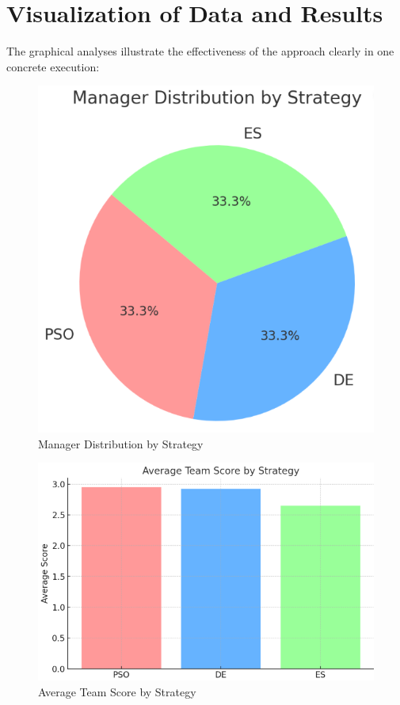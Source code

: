 \documentclass[sigconf]{acmart}
\begin{document}
	\section{Visualization of Data and Results}
	The graphical analyses illustrate the effectiveness of the approach clearly in one concrete execution:
	
	\begin{figure}[H]
		\centering
		\includegraphics[width=0.9\linewidth]{plot/manager_distribution.png}
		\caption{Manager Distribution by Strategy}
		\label{fig:manager_distribution}
	\end{figure}
	
	\begin{figure}[H]
		\centering
		\includegraphics[width=0.9\linewidth]{plot/average_team_score_strategy.png}
		\caption{Average Team Score by Strategy}
		\label{fig:avg_team_score}
	\end{figure}
	
\end{document}
